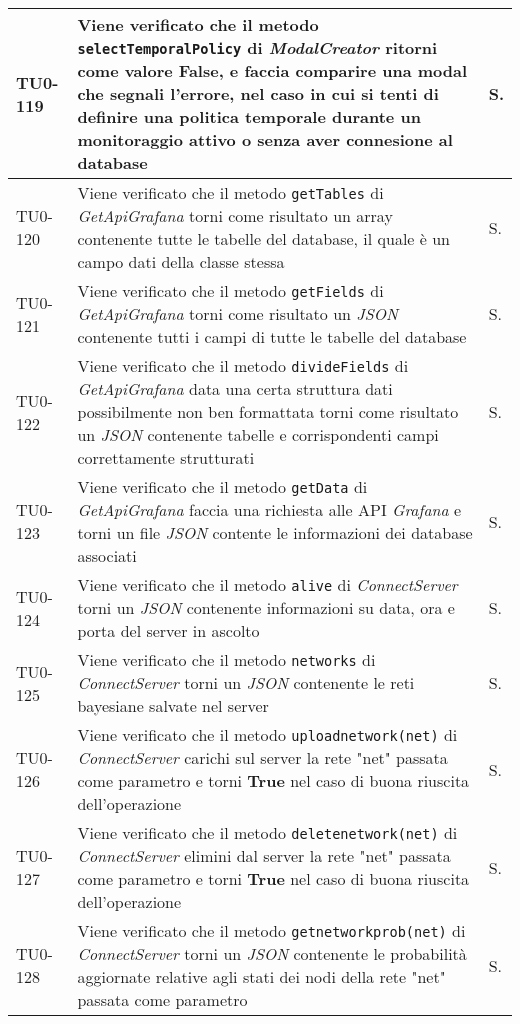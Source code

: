 \begin{longtable}{|C{.15\textwidth}|m{.66\textwidth}|C{.10\textwidth}|}
\hline
{}TU0-119 & Viene verificato che il metodo \texttt{selectTemporalPolicy} di \textit{ModalCreator} ritorni come valore \textbf{False}, e faccia comparire una modal che segnali l'errore, nel caso in cui si tenti di definire una politica temporale durante un monitoraggio attivo o senza aver connesione al database & S. \\
\hline
TU0-120 & Viene verificato che il metodo \texttt{getTables} di \textit{GetApiGrafana} torni come risultato un array contenente tutte le tabelle del database, il quale è un campo dati della classe stessa & S.\\
\hline
{}TU0-121 & Viene verificato che il metodo \texttt{getFields} di \textit{GetApiGrafana} torni come risultato un \textit{JSON} contenente tutti i campi di tutte le tabelle del database & S.\\
\hline
TU0-122 & Viene verificato che il metodo \texttt{divideFields} di \textit{GetApiGrafana} data una certa struttura dati possibilmente non ben formattata torni come risultato un \textit{JSON} contenente tabelle e corrispondenti campi correttamente strutturati & S.\\
\hline
{}TU0-123 & Viene verificato che il metodo \texttt{getData} di \textit{GetApiGrafana} faccia una richiesta alle API \textit{Grafana} e torni un file \textit{JSON} contente le informazioni dei database associati & S.\\
\hline
TU0-124 & Viene verificato che il metodo \texttt{alive} di \textit{ConnectServer} torni un \textit{JSON} contenente informazioni su data, ora e porta del server in ascolto & S.\\
\hline
{}TU0-125 & Viene verificato che il metodo \texttt{networks} di \textit{ConnectServer} torni un \textit{JSON} contenente le reti bayesiane salvate nel server & S.\\
\hline
TU0-126 & Viene verificato che il metodo \texttt{uploadnetwork(net)} di \textit{ConnectServer} carichi sul server la rete "net" passata come parametro e torni \textbf{True} nel caso di buona riuscita dell'operazione & S.\\
\hline
{}TU0-127 & Viene verificato che il metodo \texttt{deletenetwork(net)} di \textit{ConnectServer} elimini dal server la rete "net" passata come parametro e torni \textbf{True} nel caso di buona riuscita dell'operazione & S.\\
\hline
TU0-128 & Viene verificato che il metodo \texttt{getnetworkprob(net)} di \textit{ConnectServer} torni un \textit{JSON} contenente le probabilità aggiornate relative agli stati dei nodi della rete "net" passata come parametro & S.\\

\end{longtable}
